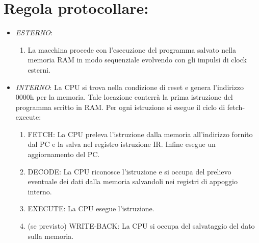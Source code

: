 \section{Regola protocollare:}
\begin{itemize}
	\item \textit{ESTERNO}:
	\begin{enumerate}
		\item La macchina procede con l'esecuzione del programma salvato nella memoria RAM in modo sequenziale evolvendo con gli impulsi di clock esterni.
	\end{enumerate}

	\item \textit{INTERNO}:
	La CPU si trova nella condizione di reset e genera l'indirizzo 0000h per la memoria. Tale locazione conterrà la prima istruzione del programma scritto in RAM. Per ogni istruzione si esegue il ciclo di fetch-execute:
	\begin{enumerate}
		\item FETCH: La CPU preleva l'istruzione dalla memoria all'indirizzo fornito dal PC e la salva nel registro istruzione IR. Infine esegue un aggiornamento del PC.
		\item DECODE: La CPU riconosce l'istruzione e si occupa del prelievo eventuale dei dati dalla memoria salvandoli nei registri di appoggio interno.
		\item EXECUTE: La CPU esegue l'istruzione.
		\item (se previsto) WRITE-BACK: La CPU si occupa del salvataggio del dato sulla memoria.
	\end{enumerate}
\end{itemize}


